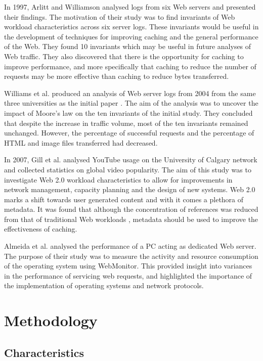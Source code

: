 \documentclass[10pt,conference]{IEEEtran}
\begin{document}
In 1997, Arlitt and Williamson \cite{keynote} analysed logs from six Web servers and presented their findings. The motivation of their study was to find invariants of Web workload characteristics across six server logs. These invariants would be useful in the development of techniques for improving caching and the general performance of the Web. They found 10 invariants which may be useful in future analyses of Web traffic. They also discovered that there is the opportunity for caching to improve performance, and more specifically that caching to reduce the number of requests may be more effective than caching to reduce bytes transferred.

Williams et al. \cite{williams05} produced an analysis of Web server logs from 2004 from the same three universities as the initial paper \cite{keynote}. The aim of the analysis was to uncover the impact of Moore's law on the ten invariants of the initial study. They concluded that despite the increase in traffic volume, most of the ten invariants remained unchanged. However, the percentage of successful requests and the percentage of HTML and image files transferred had decreased. 

In 2007, Gill et al. \cite{youtube} analysed YouTube usage on the University of Calgary network and collected statistics on global video popularity. The aim of this study was to investigate Web 2.0 workload characteristics to allow for improvements in network management, capacity planning and the design of new systems. Web 2.0 marks a shift towards user generated content and with it comes a plethora of metadata. It was found that although the concentration of references was reduced from that of traditional Web workloads \cite{keynote}, metadata should be used to improve the effectiveness of caching.

Almeida et al. \cite{almeida} analysed the performance of a PC acting as dedicated Web server. The purpose of their study was to measure the activity and resource consumption of the operating system using WebMonitor. This provided insight into variances in the performance of servicing web requests, and highlighted the importance of the implementation of operating systems and network protocols.

\section{Methodology}
\subsection{Characteristics}
\end{document}
